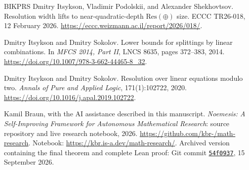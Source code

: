 \begin{thebibliography}{BIKPRS}
Dmitry Itsykson, Vladimir Podolskii, and Alexander Shekhovtsov.
\newblock Resolution width lifts to near-quadratic-depth
\(\mathrm{Res}(\oplus)\) size.
\newblock ECCC TR26-018, 12 February 2026.
\newblock \url{https://eccc.weizmann.ac.il/report/2026/018/}.

Dmitry Itsykson and Dmitry Sokolov.
\newblock Lower bounds for splittings by linear combinations.
\newblock In \emph{MFCS 2014, Part II}, LNCS 8635,
pages 372--383, 2014.
\newblock \url{https://doi.org/10.1007/978-3-662-44465-8_32}.

Dmitry Itsykson and Dmitry Sokolov.
\newblock Resolution over linear equations modulo two.
\newblock \emph{Annals of Pure and Applied Logic}, 171(1):102722, 2020.
\newblock \url{https://doi.org/10.1016/j.apal.2019.102722}.

Kamil Braun, with the AI assistance described in this manuscript.
\newblock \emph{Noemesis: A Self-Improving Framework for Autonomous Mathematical
Research}: source repository and live research notebook, 2026.
\newblock \url{https://github.com/kbr-/math-research}.
\newblock Notebook: \url{https://kbr.is-a.dev/math-research/}.
\newblock Archived version containing the final theorem and complete Lean proof:
Git commit \href{https://github.com/kbr-/math-research/tree/54f09378e97465522b7f1caf115f90ad1faa7a57}
{\texttt{54f0937}}, 15 September 2026.

\end{thebibliography}
